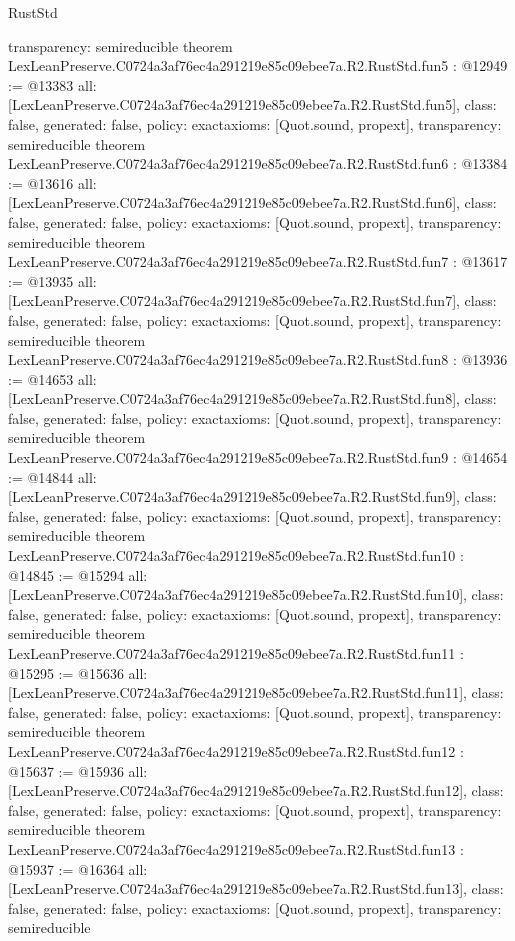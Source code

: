 \begin{lexlean}{RustStd}
\begin{coremodule}
{  transparency: semireducible
}
theorem LexLeanPreserve.C0724a3af76ec4a291219e85c09ebee7a.R2.RustStd.fun5 : @12949 := @13383 {
  all: [LexLeanPreserve.C0724a3af76ec4a291219e85c09ebee7a.R2.RustStd.fun5],
  class: false,
  generated: false,
  policy: exact{axioms: [Quot.sound, propext]},
  transparency: semireducible
}
theorem LexLeanPreserve.C0724a3af76ec4a291219e85c09ebee7a.R2.RustStd.fun6 : @13384 := @13616 {
  all: [LexLeanPreserve.C0724a3af76ec4a291219e85c09ebee7a.R2.RustStd.fun6],
  class: false,
  generated: false,
  policy: exact{axioms: [Quot.sound, propext]},
  transparency: semireducible
}
theorem LexLeanPreserve.C0724a3af76ec4a291219e85c09ebee7a.R2.RustStd.fun7 : @13617 := @13935 {
  all: [LexLeanPreserve.C0724a3af76ec4a291219e85c09ebee7a.R2.RustStd.fun7],
  class: false,
  generated: false,
  policy: exact{axioms: [Quot.sound, propext]},
  transparency: semireducible
}
theorem LexLeanPreserve.C0724a3af76ec4a291219e85c09ebee7a.R2.RustStd.fun8 : @13936 := @14653 {
  all: [LexLeanPreserve.C0724a3af76ec4a291219e85c09ebee7a.R2.RustStd.fun8],
  class: false,
  generated: false,
  policy: exact{axioms: [Quot.sound, propext]},
  transparency: semireducible
}
theorem LexLeanPreserve.C0724a3af76ec4a291219e85c09ebee7a.R2.RustStd.fun9 : @14654 := @14844 {
  all: [LexLeanPreserve.C0724a3af76ec4a291219e85c09ebee7a.R2.RustStd.fun9],
  class: false,
  generated: false,
  policy: exact{axioms: [Quot.sound, propext]},
  transparency: semireducible
}
theorem LexLeanPreserve.C0724a3af76ec4a291219e85c09ebee7a.R2.RustStd.fun10 : @14845 := @15294 {
  all: [LexLeanPreserve.C0724a3af76ec4a291219e85c09ebee7a.R2.RustStd.fun10],
  class: false,
  generated: false,
  policy: exact{axioms: [Quot.sound, propext]},
  transparency: semireducible
}
theorem LexLeanPreserve.C0724a3af76ec4a291219e85c09ebee7a.R2.RustStd.fun11 : @15295 := @15636 {
  all: [LexLeanPreserve.C0724a3af76ec4a291219e85c09ebee7a.R2.RustStd.fun11],
  class: false,
  generated: false,
  policy: exact{axioms: [Quot.sound, propext]},
  transparency: semireducible
}
theorem LexLeanPreserve.C0724a3af76ec4a291219e85c09ebee7a.R2.RustStd.fun12 : @15637 := @15936 {
  all: [LexLeanPreserve.C0724a3af76ec4a291219e85c09ebee7a.R2.RustStd.fun12],
  class: false,
  generated: false,
  policy: exact{axioms: [Quot.sound, propext]},
  transparency: semireducible
}
theorem LexLeanPreserve.C0724a3af76ec4a291219e85c09ebee7a.R2.RustStd.fun13 : @15937 := @16364 {
  all: [LexLeanPreserve.C0724a3af76ec4a291219e85c09ebee7a.R2.RustStd.fun13],
  class: false,
  generated: false,
  policy: exact{axioms: [Quot.sound, propext]},
  transparency: semireducible
}
\end{coremodule}
\end{lexlean}
